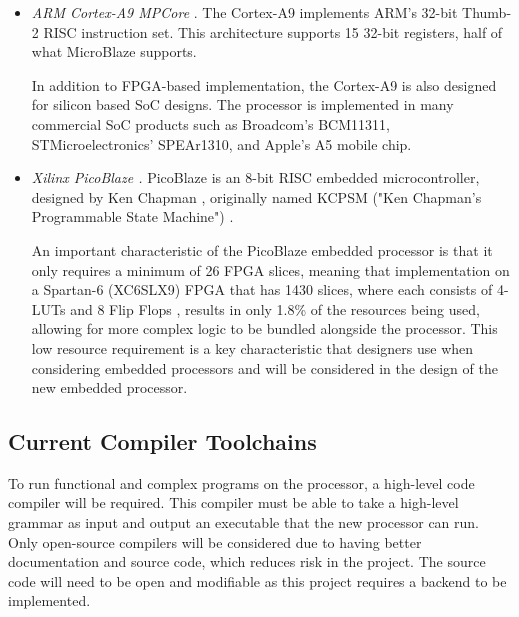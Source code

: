 \documentclass[11pt,a4paper]{report}
\begin{document}
\begin{itemize}
\item{\textit{ARM Cortex-A9 MPCore} \cite{cortexa9}. The Cortex-A9 implements ARM's 32-bit Thumb-2 RISC instruction set. This architecture supports 15 32-bit registers, half of what MicroBlaze supports.

In addition to FPGA-based implementation, the Cortex-A9 is also designed for silicon based SoC designs. The processor is implemented in many commercial SoC products such as Broadcom's BCM11311, STMicroelectronics' SPEAr1310, and Apple's A5 mobile chip. }

\item{\textit{Xilinx PicoBlaze \cite{picoblaze}.} PicoBlaze is an  8-bit RISC embedded microcontroller, designed by Ken Chapman \cite{merchant2009platform}, originally named KCPSM ("Ken Chapman's Programmable State Machine") \cite{kamat2009unleash}.

An important characteristic of the PicoBlaze embedded processor is that it only requires a minimum of 26 FPGA slices, meaning that implementation on a Spartan-6 (XC6SLX9) FPGA that has 1430 slices, where each consists of 4-LUTs and 8 Flip Flops  \cite{spartan6}, results in only 1.8\% of the resources being used, allowing for more complex logic to be bundled alongside the processor. This low resource requirement is a key characteristic that designers use when considering embedded processors and will be considered in the design of the new embedded processor.
}
\end{itemize}

\subsection{Current Compiler Toolchains}
To run functional and complex programs on the processor, a high-level code compiler will be required. This compiler must be able to take a high-level grammar as input and output an executable that the new processor can run. Only open-source compilers will be considered due to having better documentation and source code, which reduces risk in the project. The source code will need to be open and modifiable as this project requires a backend to be implemented.
\end{document}
